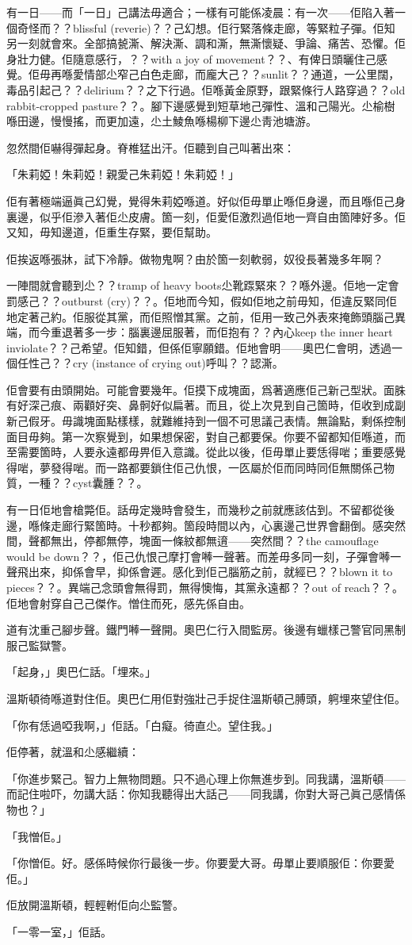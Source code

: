 有一日——而「一日」己講法毋適合；一樣有可能係凌晨：有一次——佢陷入著一個奇怪而？？blissful (reverie)？？己幻想。佢行緊落條走廊，等緊粒子彈。佢知另一刻就會來。全部搞㼭澌、解決澌、調和澌，無澌懷疑、爭論、痛苦、恐懼。佢身壯力健。佢隨意感行，？？with a joy of movement？？、有俾日頭曬住己感覺。佢毋再喺愛情部尐窄己白色走廊，而龐大己？？sunlit？？通道，一公里闊，毒品引起己？？delirium？？之下行過。佢喺黃金原野，跟緊條行人路穿過？？old rabbit-cropped pasture？？。腳下邊感覺到短草地己彈性、溫和己陽光。尐榆樹喺田邊，慢慢搖，而更加遠，尐土鯪魚喺楊柳下邊尐靑池塘游。

忽然間佢嚇得彈起身。脊椎猛出汗。佢聽到自己叫著出來：

「朱莉婭！朱莉婭！親愛己朱莉婭！朱莉婭！」

佢有著極端逼眞己幻覺，覺得朱莉婭喺道。好似佢毋單止喺佢身邊，而且喺佢己身裏邊，似乎佢滲入著佢尐皮膚。箇一刻，佢愛佢激烈過佢地一齊自由箇陣好多。佢又知，毋知邊道，佢重生存緊，要佢幫助。

佢挨返喺張牀，試下冷靜。做物鬼啊？由於箇一刻軟弱，奴役長著幾多年啊？

一陣間就會聽到尐？？tramp of heavy boots尐靴𨂽緊來？？喺外邊。佢地一定會罰感己？？outburst (cry)？？。佢地而今知，假如佢地之前毋知，佢違反緊同佢地定著己約。佢服從其黨，而佢照憎其黨。之前，佢用一致己外表來掩飾頭腦己異端，而今重退著多一步：腦裏邊屈服著，而佢抱有？？內心keep the inner heart inviolate？？己希望。佢知錯，但係佢寧願錯。佢地會明——奧巴仁會明，透過一個任性己？？cry (instance of crying out)呼叫？？認澌。

佢會要有由頭開始。可能會要幾年。佢摸下成塊面，爲著適應佢己新己型狀。面䏭有好深己痕、兩顴好突、鼻䯊好似扁著。而且，從上次見到自己箇時，佢收到成副新己假牙。毋識塊面點樣樣，就難維持到一個不可思議己表情。無論點，剩係控制面目毋夠。第一次察覺到，如果想保密，對自己都要保。你要不留都知佢喺道，而至需要箇時，人要永遠都毋畀佢入意識。從此以後，佢毋單止要恁得啱；重要感覺得啱，夢發得啱。而一路都要鎖住佢己仇恨，一匛屬於佢而同時同佢無關係己物質，一種？？cyst囊腫？？。

有一日佢地會槍斃佢。話毋定幾時會發生，而幾秒之前就應該估到。不留都從後邊，喺條走廊行緊箇時。十秒都夠。箇段時間以內，心裏邊己世界會翻倒。感突然間，聲都無出，停都無停，塊面一條紋都無逳——突然間？？the camouflage would be down？？，佢己仇恨己摩打會𠾴一聲著。而差毋多同一刻，子彈會𠾴一聲飛出來，抑係會早，抑係會遲。感化到佢己腦筋之前，就經已？？blown it to pieces？？。異端己念頭會無得罰，無得懊悔，其黨永遠都？？out of reach？？。佢地會射穿自己己傑作。憎住而死，感先係自由。

道有沈重己腳步聲。鐵門𠾴一聲開。奧巴仁行入間監房。後邊有蠟樣己警官同黑制服己監獄警。

「起身，」奧巴仁話。「埋來。」

溫斯頓徛喺道對住佢。奧巴仁用佢對強壯己手捉住溫斯頓己膊頭，䠻埋來望住佢。

「你有恁過啞我啊，」佢話。「白癡。徛直尐。望住我。」

佢停著，就溫和尐感繼續：

「你進步緊己。智力上無物問題。只不過心理上你無進步到。同我講，溫斯頓——而記住啦吓，勿講大話：你知我聽得出大話己——同我講，你對大哥己眞己感情係物也？」

「我憎佢。」

「你憎佢。好。感係時候你行最後一步。你要愛大哥。毋單止要順服佢：你要愛佢。」

佢放開溫斯頓，輕輕軵佢向尐監警。

「一零一室，」佢話。
